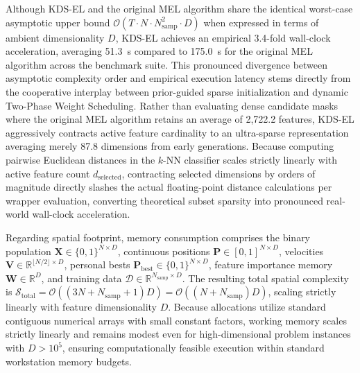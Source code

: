 Although KDS-EL and the original MEL algorithm share the identical worst-case asymptotic upper bound $\mathcal{O}(T \cdot N \cdot N_{\mathrm{samp}}^2 \cdot D)$ when expressed in terms of ambient dimensionality $D$, KDS-EL achieves an empirical 3.4-fold wall-clock acceleration, averaging 51.3~s compared to 175.0~s for the original MEL algorithm across the benchmark suite. This pronounced divergence between asymptotic complexity order and empirical execution latency stems directly from the cooperative interplay between prior-guided sparse initialization and dynamic Two-Phase Weight Scheduling. Rather than evaluating dense candidate masks where the original MEL algorithm retains an average of 2{,}722.2 features, KDS-EL aggressively contracts active feature cardinality to an ultra-sparse representation averaging merely 87.8 dimensions from early generations. Because computing pairwise Euclidean distances in the $k$-NN classifier scales strictly linearly with active feature count $d_{\mathrm{selected}}$, contracting selected dimensions by orders of magnitude directly slashes the actual floating-point distance calculations per wrapper evaluation, converting theoretical subset sparsity into pronounced real-world wall-clock acceleration.

Regarding spatial footprint, memory consumption comprises the binary population $\mathbf{X} \in \{0, 1\}^{N \times D}$, continuous positions $\mathbf{P} \in [0, 1]^{N \times D}$, velocities $\mathbf{V} \in \mathbb{R}^{\lfloor N/2 \rfloor \times D}$, personal bests $\mathbf{P}_{\mathrm{best}} \in \{0, 1\}^{N \times D}$, feature importance memory $\mathbf{W} \in \mathbb{R}^D$, and training data $\mathcal{D} \in \mathbb{R}^{N_{\mathrm{samp}} \times D}$. The resulting total spatial complexity is $\mathcal{S}_{\mathrm{total}} = \mathcal{O}\left((3N + N_{\mathrm{samp}} + 1) D\right) = \mathcal{O}\left((N + N_{\mathrm{samp}}) D\right)$, scaling strictly linearly with feature dimensionality $D$. Because allocations utilize standard contiguous numerical arrays with small constant factors, working memory scales strictly linearly and remains modest even for high-dimensional problem instances with $D > 10^5$, ensuring computationally feasible execution within standard workstation memory budgets.
